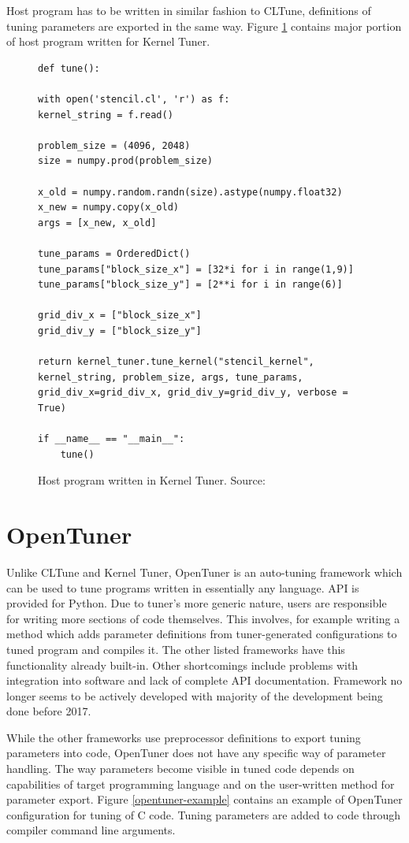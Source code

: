 \documentclass
[
    digital, %
    oneside, %
    table, %
    nolof, %
    nolot, %
    nocover %
]{fithesis3}
\begin{document}
Host program has to be written in similar fashion to CLTune, definitions of tuning parameters are exported in the same way. Figure \ref{kerneltuner-example}
contains major portion of host program written for Kernel Tuner.
\begin{figure}
\begin{lstlisting}
def tune():

with open('stencil.cl', 'r') as f:
kernel_string = f.read()

problem_size = (4096, 2048)
size = numpy.prod(problem_size)

x_old = numpy.random.randn(size).astype(numpy.float32)
x_new = numpy.copy(x_old)
args = [x_new, x_old]

tune_params = OrderedDict()
tune_params["block_size_x"] = [32*i for i in range(1,9)]
tune_params["block_size_y"] = [2**i for i in range(6)]

grid_div_x = ["block_size_x"]
grid_div_y = ["block_size_y"]

return kernel_tuner.tune_kernel("stencil_kernel", kernel_string, problem_size, args, tune_params, grid_div_x=grid_div_x, grid_div_y=grid_div_y, verbose = True)

if __name__ == "__main__":
    tune()
\end{lstlisting}
\caption{Host program written in Kernel Tuner. Source: \cite{kerneltuner-example}}
\label{kerneltuner-example}
\end{figure}

\section{OpenTuner}
Unlike CLTune and Kernel Tuner, OpenTuner \cite{opentuner} is an auto-tuning framework which can be used to tune programs written in essentially any
language. API is provided for Python. Due to tuner's more generic nature, users are responsible for writing more sections of code themselves. This
involves, for example writing a method which adds parameter definitions from tuner-generated configurations to tuned program and compiles it. The
other listed frameworks have this functionality already built-in. Other shortcomings include problems with integration into software and lack of
complete API documentation. Framework no longer seems to be actively developed with majority of the development being done before 2017.

While the other frameworks use preprocessor definitions to export tuning parameters into code, OpenTuner does not have any specific way of parameter
handling. The way parameters become visible in tuned code depends on capabilities of target programming language and on the user-written method for
parameter export. Figure \ref{opentuner-example} contains an example of OpenTuner configuration for tuning of C code. Tuning parameters are added
to code through compiler command line arguments.
\end{document}
